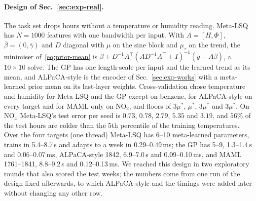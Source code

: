 \documentclass[fullpaper,final]{nldl}
\theoremstyle{plain}
\theoremstyle{definition}
\begin{document}
\paragraph{Design of Sec.~\ref{sec:exp-real}.} The task set drops hours without a
temperature or humidity reading. Meta-LSQ has $N{=}1000$ features with one bandwidth
per input. With $A = [H,\Phi]$, $\bar\beta = (0,\bar\gamma)$ and $D$ diagonal with
$\mu$ on the sine block and $\mu_\tau$ on the trend, the minimiser
of~\eqref{eq:prior-mean} is $\bar\beta + D^{-1}A^\top(AD^{-1}A^\top + I)^{-1}(y -
A\bar\beta)$, a $10\times10$ solve. The GP has one length-scale per input and the
learned trend as its mean, and ALPaCA-style is the encoder of
Sec.~\ref{sec:exp-works} with a meta-learned prior mean on its last-layer weights.
Cross-validation chose temperature and humidity for Meta-LSQ and the GP except on
benzene, for ALPaCA-style on every target and for MAML only on NO$_2$, and floors
of $3\mu^\ast$, $\mu^\ast$, $3\mu^\ast$ and $3\mu^\ast$. On NO$_x$ Meta-LSQ's test error
per seed is $0.73$, $0.78$, $2.79$, $5.35$ and $3.19$, and $56\%$ of the test hours
are colder than the 5th percentile of the training temperatures. Over the
four targets (one thread) Meta-LSQ has 6--10 meta-learned parameters, trains in
5.4--8.7\,s and adapts to a week in 0.29--0.49\,ms; the GP has 5--9, 1.3--1.4\,s and
0.06--0.07\,ms, ALPaCA-style 1842, 6.9--7.0\,s and 0.09--0.10\,ms, and MAML
1761--1841, 8.8--9.2\,s and 0.12--0.13\,ms. We reached this design in two
exploratory rounds that also scored the test weeks; the numbers come from one run
of the design fixed afterwards, to which ALPaCA-style and the timings were added
later without changing any other row.
\end{document}
